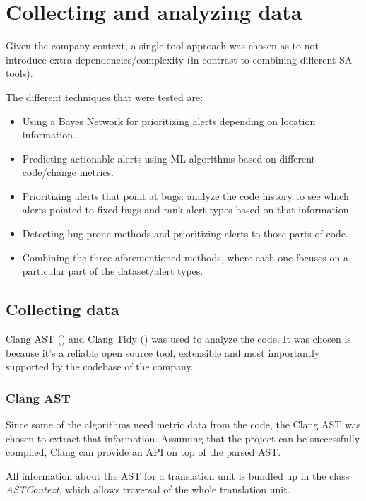 
\section{Collecting and analyzing data}\label{sec:data}

Given the company context, a single tool approach was chosen as to not introduce extra dependencies/complexity (in contrast to combining different SA tools). 

The different techniques that were tested are:
\begin{itemize}
	\item Using a Bayes Network for prioritizing alerts depending on location information.
	\item Predicting actionable alerts using ML algorithms based on different code/change metrics.
	\item Prioritizing alerts that point at bugs: analyze the code history to see which alerts pointed to fixed bugs and rank alert types based on that information.
	\item Detecting bug-prone methods and prioritizing alerts to those parts of code.
	\item Combining the three aforementioned methods, where each one focuses on a particular part of the dataset/alert types.
\end{itemize}

\subsection{Collecting data}

Clang AST (\cite{clang_ast}) and Clang Tidy (\cite{clang_tidy}) was used to analyze the code. It was chosen is because it's a reliable open source tool, extensible and most importantly supported by the codebase of the company.

\subsubsection{Clang AST}
Since some of the algorithms need metric data from the code, the Clang AST was chosen to extract that information. Assuming that the project can be successfully compiled, Clang can provide an API on top of the parsed AST.  

All information about the AST for a translation unit is bundled up in the class \textit{ASTContext}, which allows traversal of the whole translation unit.

